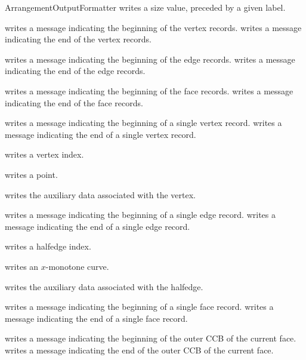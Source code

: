 \begin{ccRefConcept}{ArrangementOutputFormatter}
    {writes a size value, preceded by a given label.}

    {writes a message indicating the beginning of the vertex records.}
\ccGlue
{}
    {writes a message indicating the end of the vertex records.}

    {writes a message indicating the beginning of the edge records.}
\ccGlue
{}
    {writes a message indicating the end of the edge records.}

    {writes a message indicating the beginning of the face records.}
\ccGlue
{}
    {writes a message indicating the end of the face records.}

    {writes a message indicating the beginning of a single vertex record.}
\ccGlue
{}
    {writes a message indicating the end of a single vertex record.}

    {writes a vertex index.}

    {writes a point.}

    {writes the auxiliary data associated with the vertex.}

    {writes a message indicating the beginning of a single edge record.}
\ccGlue
{}
    {writes a message indicating the end of a single edge record.}

    {writes a halfedge index.}

    {writes an $x$-monotone curve.}

    {writes the auxiliary data associated with the halfedge.}

    {writes a message indicating the beginning of a single face record.}
\ccGlue
{}
    {writes a message indicating the end of a single face record.}

    {writes a message indicating the beginning of the outer CCB of the current face.}
\ccGlue
{}
    {writes a message indicating the end of the outer CCB of the current face.}


\end{ccRefConcept}
